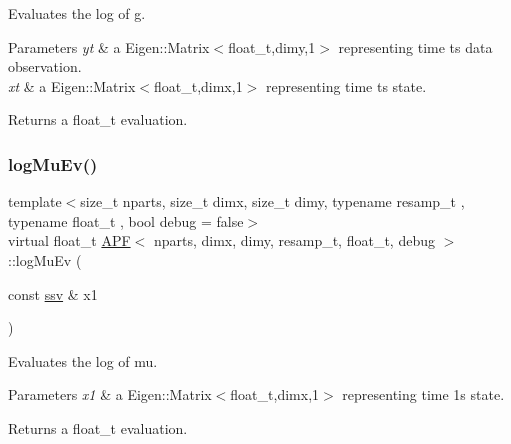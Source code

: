 Evaluates the log of g. 


\begin{DoxyParams}{Parameters}
{\em yt} & a Eigen\+::\+Matrix$<$float\+\_\+t,dimy,1$>$ representing time t\textquotesingle{}s data observation. \\
\hline
{\em xt} & a Eigen\+::\+Matrix$<$float\+\_\+t,dimx,1$>$ representing time t\textquotesingle{}s state. \\
\hline
\end{DoxyParams}
\begin{DoxyReturn}{Returns}
a float\+\_\+t evaluation. 
\end{DoxyReturn}
\mbox{\label{classAPF_a5aec51329be45a220697573bedb2f547}} 
\subsubsection{\texorpdfstring{log\+Mu\+Ev()}{logMuEv()}}
{\footnotesize\ttfamily template$<$size\+\_\+t nparts, size\+\_\+t dimx, size\+\_\+t dimy, typename resamp\+\_\+t , typename float\+\_\+t , bool debug = false$>$ \\
virtual float\+\_\+t \hyperlink{classAPF}{A\+PF}$<$ nparts, dimx, dimy, resamp\+\_\+t, float\+\_\+t, debug $>$\+::log\+Mu\+Ev (\begin{DoxyParamCaption}\item[{const \hyperlink{classAPF_a8b170471292cd6fb5c3c19b55b42fc4e}{ssv} \&}]{x1 }\end{DoxyParamCaption})\hspace{0.3cm}{\ttfamily [pure virtual]}}



Evaluates the log of mu. 


\begin{DoxyParams}{Parameters}
{\em x1} & a Eigen\+::\+Matrix$<$float\+\_\+t,dimx,1$>$ representing time 1\textquotesingle{}s state. \\
\hline
\end{DoxyParams}
\begin{DoxyReturn}{Returns}
a float\+\_\+t evaluation. 
\end{DoxyReturn}
\mbox{\label{classAPF_a87628cc243a8d0244303ccf50e18d90e}} 
